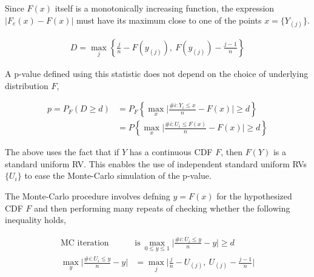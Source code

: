 Since $ F(x) $ itself is a monotonically increasing function, the expression $ |F_e (x) - F(x)| $ must have its maximum close to one of the points $ x = \{Y_{(j)}\} $. 

\begin{align}
	D = \max_j \left\{ \frac{j}{n} - F(y_{(j)}),\ F(y_{(j)}) - \frac{j-1}{n} \right\}
\end{align}

A p-value defined using this statistic does not depend on the choice of underlying distribution $ F $,

\begin{align}
	p = P_F (D \geq d) &= P_F \left\{ \max_x \Bigg| \frac{\#i : Y_i \leq x}{n}  - F(x)\Bigg| \geq d \right\}\\
	&= P \left\{ \max_x \Bigg| \frac{\#i : U_i \leq F(x)}{n}  - F(x)\Bigg| \geq d \right\}
\end{align}

The above uses the fact that if $ Y $ has a continuous CDF $ F $, then $ F(Y) $ is a standard uniform RV. This enables the use of independent standard uniform RVs $ \{U_i\} $ to ease the Monte-Carlo simulation of the p-value.

The Monte-Carlo procedure involves defning $ y = F(x) $ for the hypothesized CDF $ F $ and then performing many repeats of checking whether the following inequality holds,

\begin{align}
	\text{MC iteration } & \text{is}\ \max_{0 \leq y \leq 1} \Bigg| \frac{\#i : U_i \leq y}{n}  - y\Bigg| \geq d \\
	\max_{y} \Bigg| \frac{\#i : U_i \leq y}{n}  - y\Bigg| &= \max_{j} \Bigg| \frac{j}{n} - U_{(j)},\ U_{(j)} - \frac{j-1}{n} \Bigg|
\end{align}

